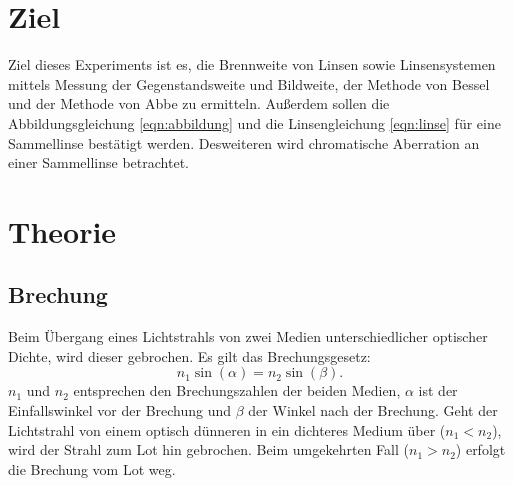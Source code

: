 \section{Ziel}
\label{sec:Ziel}
Ziel dieses Experiments ist es, die Brennweite von Linsen sowie Linsensystemen mittels Messung der Gegenstandsweite und Bildweite, der Methode von Bessel und der Methode von Abbe zu ermitteln. Außerdem sollen die Abbildungsgleichung \eqref{eqn:abbildung} und die Linsengleichung \eqref{eqn:linse} für eine Sammellinse bestätigt werden. Desweiteren wird chromatische Aberration an einer Sammellinse betrachtet.


\section{Theorie}
\label{sec:theorie}
\subsection{Brechung}
Beim Übergang eines Lichtstrahls von zwei Medien unterschiedlicher optischer Dichte, wird dieser gebrochen. Es gilt das Brechungsgesetz:
\begin{equation}
n_1 \sin(\alpha)=n_2 \sin(\beta).
\end{equation}
$n_1$ und $n_2$ entsprechen den Brechungszahlen der beiden Medien, $\alpha$ ist der Einfallswinkel vor der Brechung und $\beta$ der Winkel nach der Brechung. Geht der Lichtstrahl von einem optisch dünneren in ein dichteres Medium über ($n_1 < n_2$), wird der Strahl zum Lot hin gebrochen. Beim umgekehrten Fall ($n_1 > n_2$) erfolgt die Brechung vom Lot weg.
